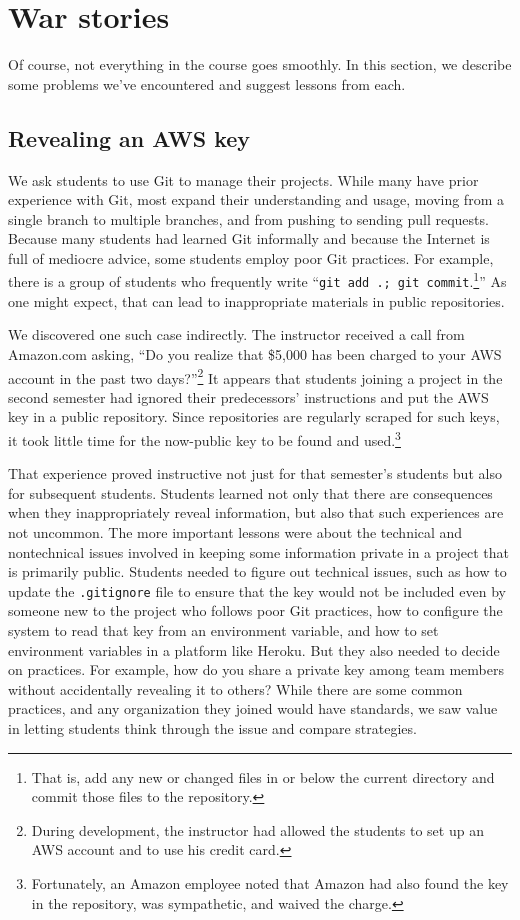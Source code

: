 \section{War stories}

Of course, not everything in the course goes smoothly.  In this section,
we describe some problems we've encountered and suggest lessons from each.

\subsection{Revealing an AWS key}

We ask students to use Git to manage their projects.  While many
have prior experience with Git, most expand
their understanding and usage, moving
from a single branch to multiple branches, and from pushing
to sending pull requests.  Because many students had learned Git
informally and because the Internet is full of mediocre advice,
some students employ poor Git practices.  For example, there is a
group of students who frequently write ``\texttt{git add .; git
commit}.\footnote{That is, add any new or changed files in or below
the current directory and commit those files to the repository.}''
As one might expect, that can lead to inappropriate materials in
public repositories.

We discovered one such case indirectly.  The instructor received
a call from Amazon.com asking, ``Do you realize that \$5,000 has
been charged to your AWS account in the past two days?''\footnote{During
development, the instructor had allowed the students to set up an
AWS account and to use his credit card.}  It appears that students
joining a project in the second semester had ignored their predecessors'
instructions and put the AWS key in a public repository.  Since
repositories are regularly scraped for such
keys, it took little time for the now-public key to be found and
used.\footnote{Fortunately, an Amazon employee noted that Amazon
had also found the key in the repository, was sympathetic, and
waived the charge.}

That experience proved instructive not just for that semester's
students but also for subsequent students.  Students learned not
only that there are consequences when they inappropriately reveal
information, but also that such experiences are not uncommon.  The
more important lessons were about the technical and nontechnical
issues involved in keeping some information private in a project
that is primarily public.  Students needed to figure out technical
issues, such as how to update the \texttt{.gitignore} file to ensure
that the key would not be included even by someone new to the
project who follows poor Git practices, how to configure the system to read
that key from an environment variable, and how to set environment
variables in a platform like Heroku.  But they also needed to decide
on practices.  For example, how do you share a private key among
team members without accidentally revealing it to others?  While
there are some common practices, and any organization they joined
would have standards, we saw value in letting students think through
the issue and compare strategies.

